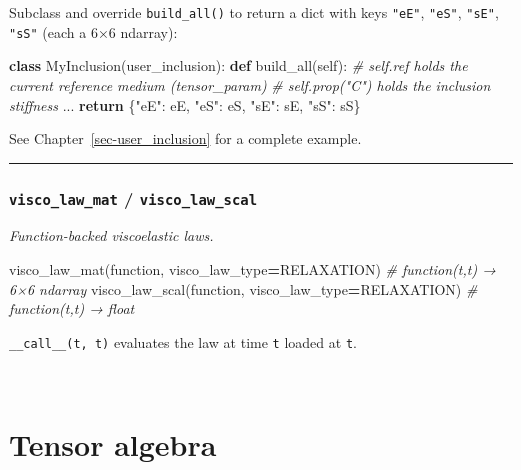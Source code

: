 \documentclass[
  a4paper,
  numbers=noendperiod,
  DIV=12]{scrreprt}
\newenvironment{Shaded}{\begin{snugshade}}{\end{snugshade}}
\newcommand{\CommentTok}[1]{\textcolor[rgb]{0.56,0.35,0.01}{\textit{#1}}}
\newcommand{\ControlFlowTok}[1]{\textcolor[rgb]{0.13,0.29,0.53}{\textbf{#1}}}
\newcommand{\KeywordTok}[1]{\textcolor[rgb]{0.13,0.29,0.53}{\textbf{#1}}}
\newcommand{\NormalTok}[1]{#1}
\newcommand{\OperatorTok}[1]{\textcolor[rgb]{0.81,0.36,0.00}{\textbf{#1}}}
\newcommand{\StringTok}[1]{\textcolor[rgb]{0.31,0.60,0.02}{#1}}
\newcommand{\VariableTok}[1]{\textcolor[rgb]{0.00,0.00,0.00}{#1}}
\begin{document}
Subclass and override \texttt{build\_all()} to return a dict with keys
\texttt{"eE"}, \texttt{"eS"}, \texttt{"sE"}, \texttt{"sS"} (each a 6×6
ndarray):

\begin{Shaded}
\begin{Highlighting}[]
\KeywordTok{class}\NormalTok{ MyInclusion(user\_inclusion):}
    \KeywordTok{def}\NormalTok{ build\_all(}\VariableTok{self}\NormalTok{):}
        \CommentTok{\# self.ref holds the current reference medium (tensor\_param)}
        \CommentTok{\# self.prop("C") holds the inclusion stiffness}
\NormalTok{        ...}
        \ControlFlowTok{return}\NormalTok{ \{}\StringTok{"eE"}\NormalTok{: eE, }\StringTok{"eS"}\NormalTok{: eS, }\StringTok{"sE"}\NormalTok{: sE, }\StringTok{"sS"}\NormalTok{: sS\}}
\end{Highlighting}
\end{Shaded}

See Chapter~\ref{sec-user_inclusion} for a complete example.

\begin{center}\rule{0.5\linewidth}{0.5pt}\end{center}

\subsection{\texorpdfstring{\texttt{visco\_law\_mat} /
\texttt{visco\_law\_scal}}{visco\_law\_mat / visco\_law\_scal}}\label{api-visco-law-mat}

\emph{Function-backed viscoelastic laws.}

\begin{Shaded}
\begin{Highlighting}[]
\NormalTok{visco\_law\_mat(function, visco\_law\_type}\OperatorTok{=}\NormalTok{RELAXATION)  }\CommentTok{\# function(t,t\textquotesingle{}) → 6×6 ndarray}
\NormalTok{visco\_law\_scal(function, visco\_law\_type}\OperatorTok{=}\NormalTok{RELAXATION)  }\CommentTok{\# function(t,t\textquotesingle{}) → float}
\end{Highlighting}
\end{Shaded}

\texttt{\_\_call\_\_(t,\ t\textquotesingle{})} evaluates the law at time
\texttt{t} loaded at \texttt{t\textquotesingle{}}.

\(\,\)

\cleardoublepage
{}
{}
\appendix

\chapter{Tensor algebra}\label{sec-tensor_algebra}
\end{document}
